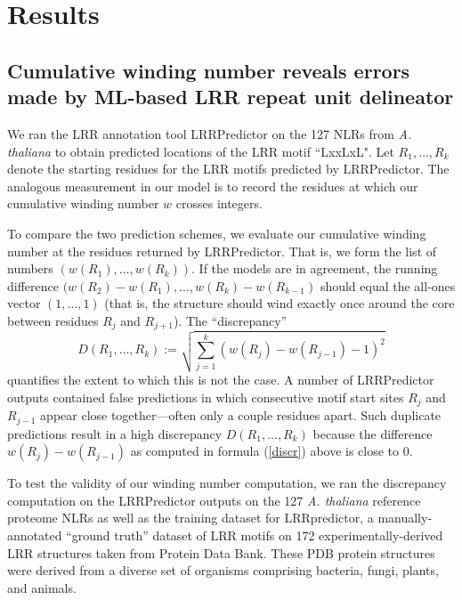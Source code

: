 \documentclass[authoryear]{article}
\begin{document}
\section*{Results}

\subsection*{Cumulative winding number reveals errors made by ML-based LRR repeat unit delineator}

We ran the LRR annotation tool LRRPredictor \cite{martin2020lrrpredictor} on the 127 NLRs from \emph{A. thaliana} to obtain predicted locations of the LRR motif ``LxxLxL". Let $R_1,\dots,R_k$ denote the starting residues for the LRR motifs predicted by LRRPredictor. The analogous measurement in our model is to record the residues at which our cumulative winding number $w$ crosses integers.

To compare the two prediction schemes, we evaluate our cumulative winding number at the residues returned by LRRPredictor. That is, we form the list of numbers $(w(R_1),\dots,w(R_k))$. If the models are in agreement, the running difference $(w(R_2) - w(R_1),\dots,w(R_k) - w(R_{k-1})$ should equal the all-ones vector $(1,\dots,1)$ (that is, the structure should wind exactly once around the core between residues $R_j$ and $R_{j+1}$). The ``discrepancy''
\begin{equation}\label{discr}
    D(R_1,\dots,R_k) := \sqrt{\sum_{j=1}^k (w(R_j) - w(R_{j-1}) - 1)^2}
\end{equation}
quantifies the extent to which this is not the case. A number of LRRPredictor outputs contained false predictions in which consecutive motif start sites $R_j$ and $R_{j-1}$ appear close together---often only a couple residues apart. Such duplicate predictions result in a high discrepancy $D(R_1, ..., R_k)$ because the difference $w(R_j) - w(R_{j-1})$ as computed in formula (\ref{discr}) above is close to 0.

To test the validity of our winding number computation, we ran the discrepancy computation on the LRRPredictor outputs on the 127 \emph{A. thaliana} reference proteome NLRs as well as the training dataset for LRRpredictor, a manually-annotated ``ground truth'' dataset of LRR motifs on 172 experimentally-derived LRR structures taken from Protein Data Bank. These PDB protein structures were derived from a diverse set of organisms comprising bacteria, fungi, plants, and animals.
\end{document}

